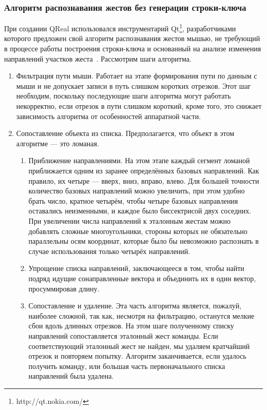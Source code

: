\documentclass[a5paper]{article}
\begin{document}
\subsubsection{Алгоритм распознавания жестов без генерации строки-ключа}
\label{qtAlgorithm}
При создании QReal использовался инструментарий Qt\footnote{http://qt.nokia.com/}, разработчиками которого предложен свой алгоритм распознавания жестов мышью, не требующий в процессе работы построения строки-ключа и основанный на анализе изменения направлений участков жеста~\cite{qtGestures}. Рассмотрим шаги алгоритма.
\begin{enumerate}
  \item Фильтрация пути мыши. Работает на этапе формирования пути по данным с мыши и не допускает записи в путь слишком коротких отрезков. Этот шаг необходим, поскольку последующие шаги алгоритма могут работать некорректно, если отрезок в пути слишком короткий, кроме того, это снижает зависимость алгоритма от особенностей аппаратной части.
  \item Сопоставление объекта из списка. Предполагается, что объект в этом алгоритме --- это ломаная.
  \begin{enumerate}
    \item Приближение направлениями. На этом этапе каждый сегмент ломаной приближается одним из заранее определённых базовых направлений. Как правило, их четыре --- вверх, вниз, вправо, влево. Для большей точности количество базовых направлений можно увеличить, при этом удобно брать число, кратное четырём, чтобы четыре базовых направления оставались неизменными, и каждое было биссектрисой двух соседних. При увеличении числа направлений к эталонным жестам можно добавлять сложные многоугольники, стороны которых не обязательно параллельны осям координат, которые было бы невозможно распознать в случае использования только четырёх направлений.
    \item Упрощение списка направлений, заключающееся в том, чтобы найти подряд идущие сонаправленные вектора и объединить их в один вектор, просуммировав длину.
    \item Сопоставление и удаление. Эта часть алгоритма является, пожалуй, наиболее сложной, так как, несмотря на фильтрацию, останутся мелкие сбои вдоль длинных отрезков. На этом шаге полученному списку направлений сопоставляется эталонный жест команды. Если соответствующий эталонный жест не найден, мы удаляем кратчайший отрезок и повторяем попытку. Алгоритм заканчивается, если удалось получить команду, или большая часть первоначального списка направлений была удалена.
  \end{enumerate}
\end{enumerate}
\end{document}
